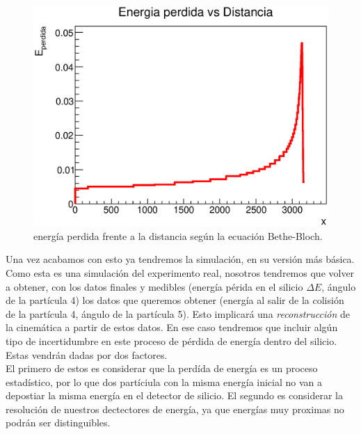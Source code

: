 \documentclass[12pt,a4paper]{article}
\numberwithin{equation}{section}
\numberwithin{figure}{section}
\begin{document}
\begin{enumerate}
    \begin{figure}[h!] \centering
        \includegraphics[scale=0.7]{srim.eps}
        \caption{energía perdida frente a la distancia según la ecuación Bethe-Bloch.}
        \label{Fig:energia_perdida}
    \end{figure}

\end{enumerate}

Una vez acabamos con esto ya tendremos la simulación, en su versión más básica. Como esta es una simulación del experimento real, nosotros tendremos que volver a obtener, con los datos finales y medibles (energía périda en el silicio $\Delta E$, ángulo de la partícula 4) los datos que queremos obtener (energía al salir de la colisión de la partícula 4, ángulo de la partícula 5). Esto implicará una {\it reconstrucción} de la cinemática a partir de estos datos. En ese caso tendremos que incluir algún tipo de incertidumbre en este proceso de pérdida de energía dentro del silicio. Estas vendrán dadas por dos factores. \\


El primero de estos es considerar que la perdída de energía es un proceso estadístico, por lo que dos partíciula con la misma energía inicial no van a depostiar la misma energía en el detector de silicio. El segundo es considerar la resolución de nuestros dectectores de energía, ya que energías muy proximas no podrán ser distinguibles. 
\end{document}
